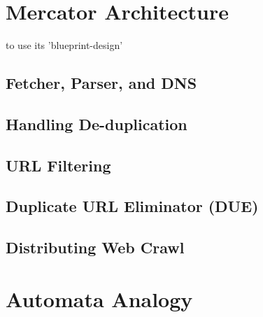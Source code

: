 \section{Mercator Architecture}
to use its 'blueprint-design'

\subsection{Fetcher, Parser, and DNS}
\subsection{Handling De-duplication}
\subsection{URL Filtering}
\subsection{Duplicate URL Eliminator (DUE)}
\subsection{Distributing Web Crawl}

\pagebreak
\section{Automata Analogy}